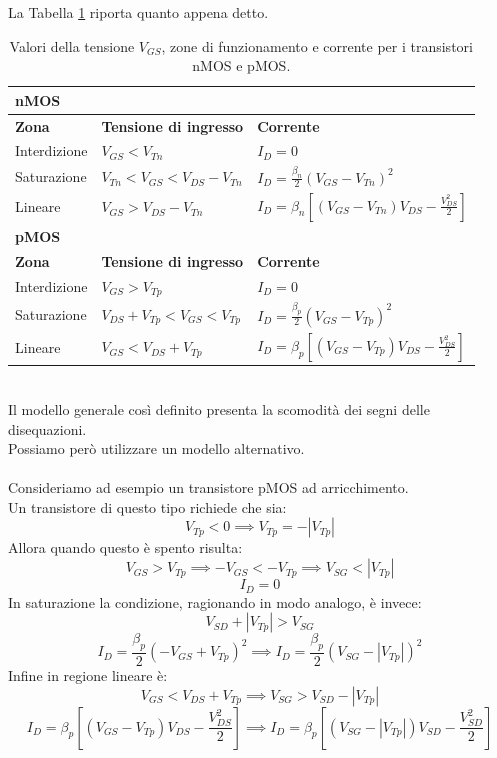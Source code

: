\documentclass[../main.tex]{subfiles}
\begin{document}
	La Tabella \ref{tab:table-14} riporta quanto appena detto.
	\begin{table}[ht]
		\centering
		\begin{tabular}{lll}
			\hline
			\textbf{nMOS} & & \\
			\hline
			\textbf{Zona} & \textbf{Tensione di ingresso} & \textbf{Corrente} \\
			\hline
			Interdizione & $V_{GS} < V_{Tn}$ & $I_D = 0$ \\
			Saturazione & $V_{Tn} < V_{GS} < V_{DS} - V_{Tn}$ & $I_D = \frac{\beta_n}{2} (V_{GS} - V_{Tn})^2$ \\
			Lineare & $V_{GS} > V_{DS} - V_{Tn}$ & $I_D = \beta_n \left[ (V_{GS} - V_{Tn}) V_{DS} - \frac{V_{DS}^2}{2} \right]$ \\
			\hline
			\textbf{pMOS} & & \\
			\hline
			\textbf{Zona} & \textbf{Tensione di ingresso} & \textbf{Corrente} \\
			\hline
			Interdizione & $V_{GS} > V_{Tp}$ & $I_D = 0$ \\
			Saturazione & $V_{DS} + V_{Tp} < V_{GS} < V_{Tp}$ & $I_D = \frac{\beta_p}{2} (V_{GS} - V_{Tp})^2$ \\
			Lineare & $V_{GS} < V_{DS} + V_{Tp}$ & $I_D = \beta_p \left[ (V_{GS} - V_{Tp}) V_{DS} - \frac{V_{DS}^2}{2} \right]$ \\
			\hline
		\end{tabular}
		\caption{Valori della tensione $V_{GS}$, zone di funzionamento e corrente per i transistori nMOS e pMOS.}
		\label{tab:table-14}
	\end{table}
	\\Il modello generale così definito presenta la scomodità dei segni delle disequazioni.\\
	Possiamo però utilizzare un modello alternativo.\\\\
	Consideriamo ad esempio un transistore pMOS ad arricchimento.\\
	Un transistore di questo tipo richiede che sia:
	$$V_{Tp} < 0 \implies V_{Tp} = -|V_{Tp}|$$
	Allora quando questo è spento risulta:
	$$V_{GS} > V_{Tp} \implies -V_{GS} < -V_{Tp} \implies V_{SG} < |V_{Tp}|$$
	$$I_D = 0$$
	In saturazione la condizione, ragionando in modo analogo, è invece:
	$$V_{SD} + |V_{Tp}| > V_{SG}$$
	$$I_D = \frac{\beta_p}{2} (-V_{GS} + V_{Tp})^2 \implies I_D = \frac{\beta_p}{2} (V_{SG} - |V_{Tp}|)^2$$
	Infine in regione lineare è:
	$$V_{GS} < V_{DS} + V_{Tp} \implies V_{SG} > V_{SD} - |V_{Tp}|$$
	$$I_D = \beta_p \left[ (V_{GS} - V_{Tp}) V_{DS} - \frac{V_{DS}^2}{2} \right] \implies I_D = \beta_p \left[ (V_{SG} - |V_{Tp}|) V_{SD} - \frac{V_{SD}^2}{2} \right]$$
\end{document}
